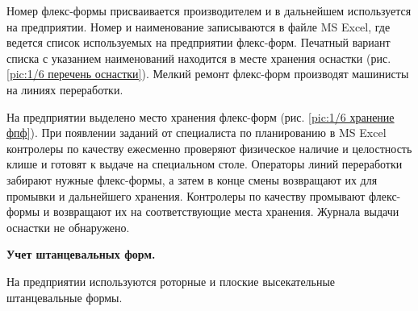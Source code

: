 Номер флекс-формы присваивается производителем и в дальнейшем используется на предприятии. Номер и наименование записываются в файле  MS Excel, где ведется список используемых на предприятии флекс-форм. Печатный вариант списка с указанием наименований находится в месте хранения оснастки (рис. \ref{pic:1/6 перечень оснастки}). 
Мелкий ремонт флекс-форм производят машинисты на линиях переработки.

На предприятии выделено место хранения флекс-форм (рис. \ref{pic:1/6 хранение фпф}).
При появлении заданий от специалиста по планированию в  MS Excel контролеры по качеству ежесменно проверяют физическое наличие и целостность клише и готовят к выдаче  на специальном столе. Операторы линий переработки забирают нужные флекс-формы, а затем в конце смены возвращают их для промывки и дальнейшего хранения. Контролеры по качеству промывают флекс-формы и возвращают их на соответствующие места хранения.
Журнала выдачи оснастки не обнаружено.



\textbf{Учет штанцевальных форм.}

На предприятии используются роторные и плоские высекательные штанцевальные формы.



